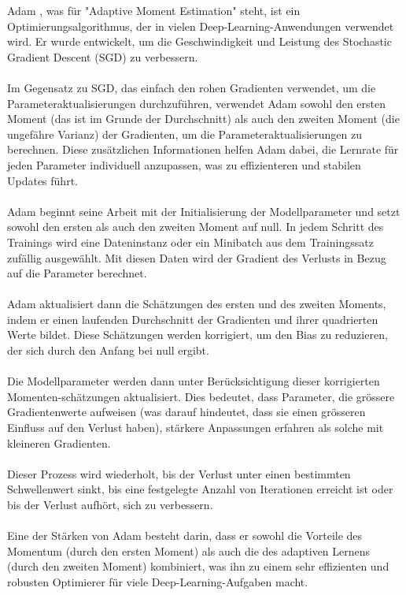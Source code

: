 \documentclass{article}
\begin{document}
Adam \cite{kingma_adam_2017}, was für "Adaptive Moment Estimation" steht, ist ein Optimierungsalgorithmus, der in vielen Deep-Learning-Anwendungen verwendet wird. Er wurde entwickelt, um die Geschwindigkeit und Leistung des Stochastic Gradient Descent (SGD) zu verbessern.\\\\
Im Gegensatz zu SGD, das einfach den rohen Gradienten verwendet, um die Parameteraktualisierungen durchzuführen, verwendet Adam sowohl den ersten Moment (das ist im Grunde der Durchschnitt) als auch den zweiten Moment (die ungefähre Varianz) der Gradienten, um die Parameteraktualisierungen zu berechnen. Diese zusätzlichen Informationen helfen Adam dabei, die Lernrate für jeden Parameter individuell anzupassen, was zu effizienteren und stabilen Updates führt.\\\\
Adam beginnt seine Arbeit mit der Initialisierung der Modellparameter und setzt sowohl den ersten als auch den zweiten Moment auf null. In jedem Schritt des Trainings wird eine Dateninstanz oder ein Minibatch aus dem Trainingssatz zufällig ausgewählt. Mit diesen Daten wird der Gradient des Verlusts in Bezug auf die Parameter berechnet.\\\\
Adam aktualisiert dann die Schätzungen des ersten und des zweiten Moments, indem er einen laufenden Durchschnitt der Gradienten und ihrer quadrierten Werte bildet. Diese Schätzungen werden korrigiert, um den Bias zu reduzieren, der sich durch den Anfang bei null ergibt.\\\\
Die Modellparameter werden dann unter Berücksichtigung dieser korrigierten Momenten-schätzungen aktualisiert. Dies bedeutet, dass Parameter, die grössere Gradientenwerte aufweisen (was darauf hindeutet, dass sie einen grösseren Einfluss auf den Verlust haben), stärkere Anpassungen erfahren als solche mit kleineren Gradienten.\\\\
Dieser Prozess wird wiederholt, bis der Verlust unter einen bestimmten Schwellenwert sinkt, bis eine festgelegte Anzahl von Iterationen erreicht ist oder bis der Verlust aufhört, sich zu verbessern.\\\\
Eine der Stärken von Adam besteht darin, dass er sowohl die Vorteile des Momentum (durch den ersten Moment) als auch die des adaptiven Lernens (durch den zweiten Moment) kombiniert, was ihn zu einem sehr effizienten und robusten Optimierer für viele Deep-Learning-Aufgaben macht.
\end{document}
